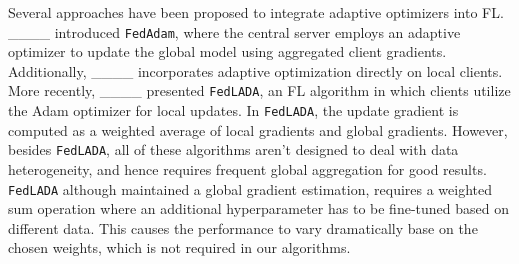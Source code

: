 Several approaches have been proposed to integrate adaptive optimizers into FL. ____ introduced {\tt FedAdam}, where the central server employs an adaptive optimizer to update the global model using aggregated client gradients. Additionally, ____ incorporates adaptive optimization directly on local clients. More recently, ____ presented {\tt FedLADA}, an FL algorithm in which clients utilize the Adam optimizer for local updates. In {\tt FedLADA}, the update gradient is computed as a weighted average of local gradients and global gradients. However, besides {\tt FedLADA}, all of these algorithms aren't designed to deal with data heterogeneity, and hence requires frequent global aggregation for good results. {\tt FedLADA} although maintained a global gradient estimation, requires a weighted sum operation where an additional hyperparameter has to be fine-tuned based on different data. This causes the performance to vary dramatically base on the chosen weights, which is not required in our algorithms.